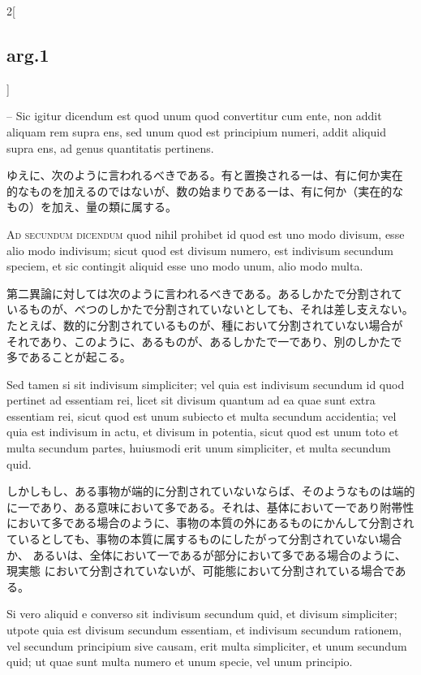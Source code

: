 \documentclass[paper=a4paper,fontsize=10pt,jafontsize=9pt,titlepage]{jlreq}
\begin{document}
\begin{paracol}{2}[\subsection{arg.1}]
\switchcolumn*

-- Sic igitur dicendum est quod unum quod convertitur cum ente, non addit
aliquam rem supra ens, sed unum quod est principium numeri, addit
aliquid supra ens, ad genus quantitatis pertinens.

\switchcolumn

ゆえに、次のように言われるべきである。有と置換される一は、有に何か実在
的なものを加えるのではないが、数の始まりである一は、有に何か（実在的な
もの）を加え、量の類に属する。

\switchcolumn*[\subsection{ad.2}]

{\scshape Ad secundum dicendum} quod nihil prohibet id quod est uno modo
divisum, esse alio modo indivisum; sicut quod est divisum numero, est
indivisum secundum speciem, et sic contingit aliquid esse uno modo unum,
alio modo multa.

\switchcolumn

第二異論に対しては次のように言われるべきである。あるしかたで分割されて
いるものが、べつのしかたで分割されていないとしても、それは差し支えない。
たとえば、数的に分割されているものが、種において分割されていない場合が
それであり、このように、あるものが、あるしかたで一であり、別のしかたで
多であることが起こる。

\switchcolumn*

Sed tamen si sit indivisum simpliciter; vel quia est indivisum
secundum id quod pertinet ad essentiam rei, licet sit divisum quantum ad
ea quae sunt extra essentiam rei, sicut quod est unum subiecto et multa
secundum accidentia; vel quia est indivisum in actu, et divisum in
potentia, sicut quod est unum toto et multa secundum partes, huiusmodi
erit unum simpliciter, et multa secundum quid.

\switchcolumn

しかしもし、ある事物が端的に分割されていないならば、そのようなものは端的
に一であり、ある意味において多である。それは、基体において一であり附帯性
において多である場合のように、事物の本質の外にあるものにかんして分割され
ているとしても、事物の本質に属するものにしたがって分割されていない場合か、
あるいは、全体において一であるが部分において多である場合のように、現実態
において分割されていないが、可能態において分割されている場合である。

\switchcolumn*

Si vero aliquid e
converso sit indivisum secundum quid, et divisum simpliciter; utpote
quia est divisum secundum essentiam, et indivisum secundum rationem, vel
secundum principium sive causam, erit multa simpliciter, et unum
secundum quid; ut quae sunt multa numero et unum specie, vel unum
principio.


\end{paracol}
\end{document}
